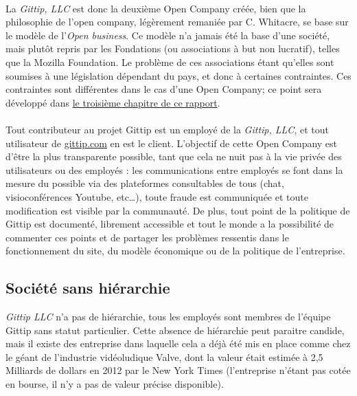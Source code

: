 \paragraph{}
La \emph{Gittip, LLC} est donc la deuxième Open Company créée, bien que la
philosophie de l'open company, légèrement remaniée par C. Whitacre, se base sur
le modèle de l'\emph{Open business}. Ce modèle n'a jamais été la base d'une
société, mais plutôt repris par les Fondations (ou associations à but non
lucratif), telles que la Mozilla Foundation. Le problème de ces associations
étant qu'elles sont soumises à une législation dépendant du pays, et donc à
certaines contraintes. Ces contraintes sont différentes dans le cas d'une Open
Company; ce point sera développé dans \hyperref[chapter3]{le troisième chapitre
de ce rapport}.

\paragraph{}
Tout contributeur au projet Gittip est un employé de la \emph{Gittip, LLC}, et
tout utilisateur de \url{gittip.com} en est le client. L'objectif de cette Open
Company est d'être la plus transparente possible, tant que cela ne nuit pas à
la vie privée des utilisateurs ou des employés : les communications entre
employés se font dans la mesure du possible via des plateformes consultables de
tous (chat, visioconférences Youtube, etc\ldots), toute fraude est communiquée
et toute modification est visible par la communauté.
De plus, tout point de la politique de Gittip est documenté, librement accessible
et tout le monde a la possibilité de commenter ces points et de partager les
problèmes ressentis dans le fonctionnement du site, du modèle économique ou de
la politique de l'entreprise.

    \subsection{Société sans hiérarchie}

\emph{Gittip LLC} n'a pas de hiérarchie, tous les employés sont membres de
l'équipe Gittip sans statut particulier. Cette absence de hiérarchie peut
paraitre candide, mais il existe des entreprise dans laquelle cela a déjà été
mis en place comme chez le géant de l'industrie vidéoludique Valve,
dont la valeur
était estimée à 2,5 Milliards de dollars en 2012 par le New York Times
(l'entreprise n'étant pas cotée en bourse, il n'y a pas de valeur précise
disponible).

